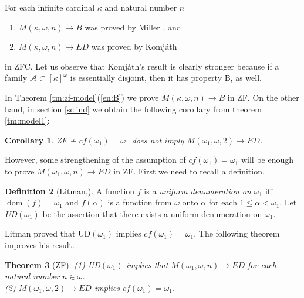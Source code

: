 \documentclass[a4paper,10pt,reqno]{amsart}
\numberwithin{equation}{section}
\newtheorem{theorem}{Theorem}[section]
\newtheorem{corollary}[theorem]{Corollary}
\theoremstyle{definition}
\newtheorem{definition}[theorem]{Definition}
\theoremstyle{remark}
\newcommand{\mc}[1]{\mathcal{#1}}
\newcommand{\subs}{\subset}
\newcommand{\dom}{\operatorname{dom}}
\begin{document}
        For each infinite cardinal ${\kappa}$ and natural number $n$
          \begin{enumerate}[(1)]
\item $M({\kappa},{\omega},n)\to B$ was proved   by Miller \cite{Mi37}, and 
\item $M({\kappa},{\omega},n)\to ED$ was proved   by Komjáth \cite{Ko84} 
\end{enumerate}    
in ZFC. Let us observe that Komjáth's result is clearly stronger because 
if a family $\mc A\subs {[{\kappa}]}^{{\omega}}$ is essentially disjoint, then 
it has property B, as well. 


In Theorem \ref{tm:zf-model}(\ref{en:B}) we prove 
$M({\kappa},{\omega},n)\to B$ in ZF. On the other hand, 
in section \ref{sc:ind} we obtain the following corollary from theorem \ref{tm:model1}:
\begin{corollary}\label{cr:notED}
ZF + $cf({\omega}_1)={\omega}_1$ does not imply  $M({\omega}_1,{\omega},2)\to ED$.
\end{corollary}



However,   some  strengthening of the assumption of $cf({\omega}_1)={\omega}_1$
will be  enough to prove  $M({\omega}_1,{\omega},n)\to ED$ in ZF.
First we need to recall a definition. 

    
    
    
    
    
    
        \begin{definition}[Litman,\cite{Li76}]
            A function $f$  is a {\em uniform denumeration on ${\omega}_1$}
            iff $\dom(f)={\omega}_1$ and $f({\alpha})$ is a function from ${\omega}$ onto ${\alpha}$
            for each $1\le {\alpha}<{\omega}_1$. 
             Let {\em UD$({\omega}_1)$} be the assertion that there exists 
             a uniform denumeration on ${\omega}_1$. 
            \end{definition}
           
        
        Litman \cite[Lemma 2.8]{Li76} proved that  
        UD$({\omega}_1)$ 
        implies $cf({\omega}_1)={\omega}_1$. The following theorem improves his result. 
 
        \begin{theorem}[ZF]\label{tm:omega1}
            (1) UD$({\omega}_1)$ implies that  
             $M({\omega}_1,{\omega},n)\to ED$  for each natural number $n\in {\omega}$. 
            \\
            \noindent (2) $M({\omega}_1,{\omega},2)\to ED$ implies $cf({\omega}_1)={\omega}_1$.
            \end{theorem}
        
\end{document}
